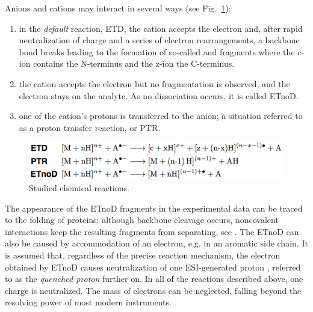 \documentclass{llncs}
\begin{document}
Anions and cations may interact in several ways (see Fig.~\ref{img::reactions}):
\begin{enumerate}
        \item in the \textit{default} reaction, ETD, the cation accepts the electron and, after rapid neutralization of charge and a series of electron rearrangements, a backbone  bond breaks leading to the formation of so-called  and  fragments where the c-ion contains the N-terminus and the z-ion the C-terminus.

        \item the cation accepts the electron but no fragmentation is observed, and the electron stays on the analyte. As no dissociation occurs, it is called ETnoD.

        \item one of the cation’s protons is transferred to the anion; a situation referred to as a proton transfer reaction, or PTR.
\end{enumerate}
\begin{figure}[h]\centering
        \includegraphics[width=\textwidth]{reactions.png}
        \caption{Studied chemical reactions.}\label{img::reactions}
\end{figure}



The appearance of the ETnoD fragments in the experimental data can be traced to the folding of proteins: although backbone cleavage occurs, noncovalent interactions keep the resulting fragments from separating, see \cite{Lermyte2014-vu,Lermyte2015-oy}. The ETnoD can also be caused by accommodation of an electron, e.g. in an aromatic side chain. It is assumed that, regardless of the precise reaction mechanism, the electron obtained by ETnoD causes neutralization of one ESI-generated proton \cite{Lermyte2015-lm}, referred to as the \textit{quenched proton} further on. In all of the reactions described above, one charge is neutralized. The mass of electrons can be neglected, falling beyond the resolving power of most modern instruments.
\end{document}
